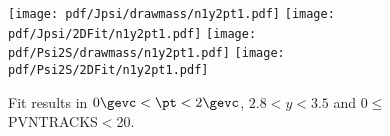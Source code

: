 \begin{figure}[H]
\begin{center}
\texttt{[image: pdf/Jpsi/drawmass/n1y2pt1.pdf]}
\texttt{[image: pdf/Jpsi/2DFit/n1y2pt1.pdf]}
\vspace*{-0.5cm}
\texttt{[image: pdf/Psi2S/drawmass/n1y2pt1.pdf]}
\texttt{[image: pdf/Psi2S/2DFit/n1y2pt1.pdf]}
\vspace*{-0.5cm}
\end{center}
\caption{Fit results in $0\gevc<\pt<2\gevc$, $2.8<y<3.5$ and 0$\leq$PVNTRACKS$<$20.}
\label{Fitn1y2pt1}
\end{figure}
